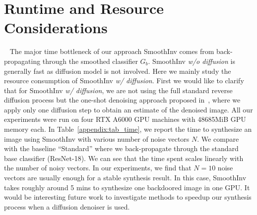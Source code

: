 \documentclass[10pt,twocolumn,letterpaper]{article}
\begin{document}
\section{Runtime and Resource Considerations}~\label{appendix:resource}
 The major time bottleneck of our approach SmoothInv comes from back-propagating through the smoothed classifier $G_{b}$. SmoothInv \textit{w/o diffusion} is generally fast as diffusion model is not involved. Here we mainly study the resource consumption of SmoothInv \textit{w/ diffusion}. First we would like to clarify that for SmoothInv \textit{w/ diffusion}, we are not using the full standard reverse diffusion process but the one-shot denoising approach proposed in~\cite{carlini2022free}, where we apply only one diffusion step to obtain an estimate of the denoised image. All our experiments were run on four RTX A6000 GPU machines with 48685MiB GPU memory each. In Table~\ref{appendix:tab_time}, we report the time to synthesize an image using SmoothInv with various number of noise vectors $N$. We compare with the baseline ``Standard'' where we back-propagate through the standard base classifier (ResNet-18). We can see that the time spent scales linearly with the number of noisy vectors. In our experiments, we find that $N=10$ noise vectors are usually enough for a stable synthesis result. In this case, SmoothInv takes roughly around 5 mins to synthesize one backdoored image in one GPU. It would be interesting future work to investigate methods to speedup our synthesis process when a diffusion denoiser is used.
\begin{table}[t!]
\Large
\renewcommand{\arraystretch}{1.1}
\addtolength{\tabcolsep}{-0.5pt}
\caption{Time (in seconds) and resource taken to synthesize an image (400 PGD iterations) for SmoothInv \textit{w/ diffusion}. We report the results with different number of noisy samples $N$. ``Standard'' corresponds to the PlainAdv baseline.}
\label{appendix:tab_time}
\end{table}
\end{document}

